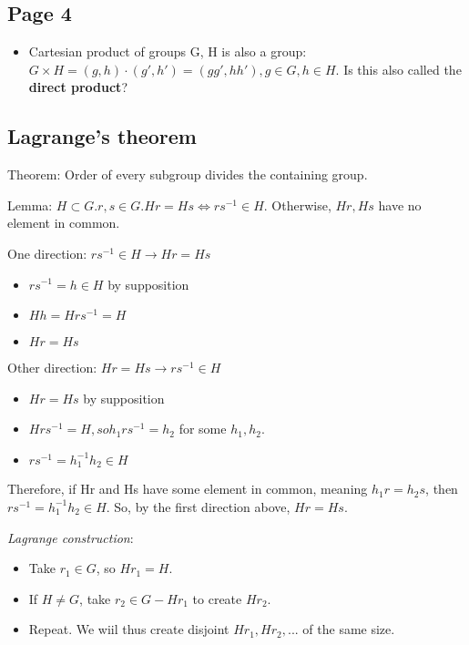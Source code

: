 \documentclass[11pt, oneside]{article}   	%
\begin{document}
\subsection {Page 4}

\begin{itemize}
\item Cartesian product of groups G, H is also a group: $G \times H = (g, h) \cdot (g', h') = (gg', hh'), g \in G, h \in H$.  Is this also called the \textbf{direct product}? 
\end{itemize}

\subsection {Lagrange's theorem}

Theorem: Order of every subgroup divides the containing group.

Lemma: $H \subset G.  r,s \in G.  Hr = Hs \iff rs^{-1} \in H$.  Otherwise, $Hr, Hs$ have no element in common.

One direction: $rs^{-1} \in H \rightarrow Hr=Hs$
\begin{itemize} 
\item $rs^{-1}  = h \in H$ by supposition
\item $Hh = Hrs^{-1} = H$
\item $Hr = Hs$
\end{itemize}

Other direction: $ Hr=Hs \rightarrow rs^{-1} \in H$
\begin{itemize} 
\item $Hr = Hs$ by supposition
\item $Hrs^{-1} = H, so h_1rs^{-1} = h_2$ for some $h_1, h_2$.
\item $rs^{-1} = h_1^{-1}h_2 \in H$
\end{itemize}

Therefore, if Hr and Hs have some element in common, meaning $h_1r=h_2s$, then $rs^{-1} = h_1^{-1}h_2 \in H$.  
So, by the first direction above, $Hr = Hs$.

\emph{Lagrange construction}:
\begin{itemize}
\item Take $r_1 \in G$, so $Hr_1 = H$.  
\item If $H \neq G$, take $r_2 \in G - Hr_1$ to create $Hr_2$.
\item Repeat.  We wiil thus create disjoint $Hr_1, Hr_2, ... $ of the same size.  
\end{itemize}
\end{document}
